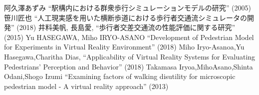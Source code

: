 ﻿%
\begin{thebibliography}{1}
 阿久澤あずみ
``駅構内における群衆歩行シミュレーションモデルの研究''
(2005)
 笹川匠也
``人工現実感を用いた横断歩道における歩行者交通流シミュレータの開発''
(2018)
 井料美帆, 長島愛,
``歩行者交差交通流の性能評価に関する研究''
(2015)
 Yu HASEGAWA, Miho IRYO-ASANO
``Development of Pedestrian Model for Experiments in Virtual Reality Environment'' (2018)
 Miho Iryo-Asanoa,Yu Hasegawa,Charitha Dias,
``Applicability of Virtual Reality Systems for Evaluating Pedestrians’ Perception and Behavior''
 (2018)
 Takamasa Iryoa,MihoAsano,Shinta Odani,Shogo Izumi
``Examining factors of walking disutility for microscopic pedestrian model - A virtual reality approach'' 
(2013)
\end{thebibliography}
